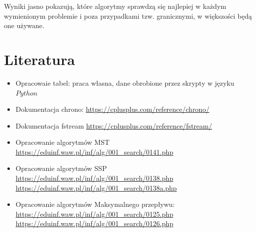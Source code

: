 \documentclass{article}
\begin{document}
Wyniki jasno pokazują, które algorytmy sprawdzą się najlepiej w każdym wymienionym problemie i poza przypadkami tzw. granicznymi, w większości będą one używane.
\section{Literatura}
\begin{itemize}
    \item Opracowaie tabel: praca własna, dane obrobione przez skrypty w języku $Python$
    \item Dokumentacja chrono: \url{https://cplusplus.com/reference/chrono/}
    \item Dokumentacja fstream \url{https://cplusplus.com/reference/fstream/}
    \item Opracowanie algorytmów MST \url{https://eduinf.waw.pl/inf/alg/001_search/0141.php}
    \item Opracowanie algorytmów SSP \\ \url{https://eduinf.waw.pl/inf/alg/001_search/0138.php} \\ \url{https://eduinf.waw.pl/inf/alg/001_search/0138a.php}
    \item Opracowanie algorytmów Maksymalnego przepływu: \\ \url{https://eduinf.waw.pl/inf/alg/001_search/0125.php} \\ \url{https://eduinf.waw.pl/inf/alg/001_search/0126.php}
\end{itemize}
\end{document}
